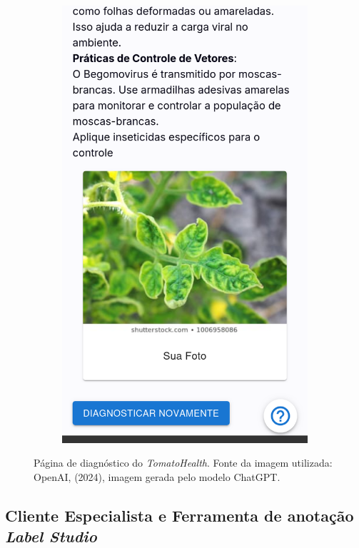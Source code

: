 \begin{figure}[htp]
\begin{subfigure}{0.3\textwidth}
        \includegraphics[width=\linewidth, height=0.4\textheight, keepaspectratio]{images/diagnostic6.png}
    \end{subfigure}
    
    \caption{Página de diagnóstico do \emph{TomatoHealth}. Fonte da imagem utilizada: OpenAI, (2024), imagem gerada pelo modelo ChatGPT.}        
    \label{fig:diagnostic}
\end{figure}


\subsection{Cliente Especialista e Ferramenta de anotação \emph{Label Studio}}

